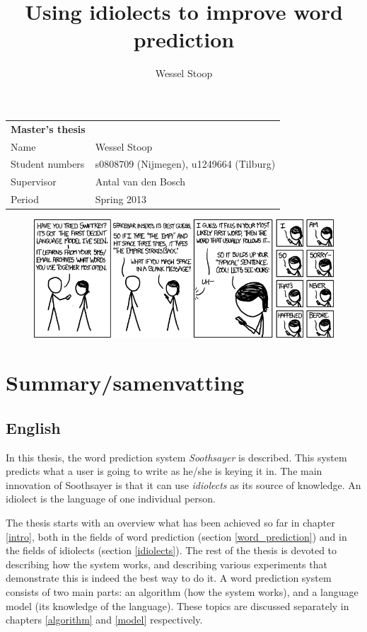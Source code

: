 \documentclass[12pt]{article}
\title{Using idiolects to improve word prediction}
\author{Wessel Stoop}
\let\stdsection\section
\renewcommand\section{\newpage\stdsection}
\let\originaltable\table
\let\endoriginaltable\endtable
\renewenvironment{table}[1][ht]{%
  \originaltable[#1]
  \centering}%
  {\endoriginaltable}
\begin{document}
\begin{table}[b]
\begin{tabular}{ll}
\textbf{Master's thesis}&\\
Name&Wessel Stoop\\
Student numbers&s0808709 (Nijmegen), u1249664 (Tilburg)\\
Supervisor&Antal van den Bosch\\
Period&Spring 2013\\
\end{tabular}
\end{table}

\maketitle
\thispagestyle{empty}

\begin{figure}
\includegraphics[scale=0.5]{swiftkey}
\end{figure}

\clearpage

\tableofcontents
\listoftables
\listoffigures

\section{Summary/samenvatting}

\subsection{English}
In this thesis, the word prediction system \emph{Soothsayer} is described. This system predicts what a user is going to write as he/she is keying it in. The main innovation of Soothsayer is that it can use \emph{idiolects} as its source of knowledge. An idiolect is the language of one individual person. 

The thesis starts with an overview what has been achieved so far in chapter \ref{intro}, both in the fields of word prediction (section \ref{word_prediction}) and in the fields of idiolects (section \ref{idiolects}). The rest of the thesis is devoted to describing how the system works, and describing various experiments that demonstrate this is indeed the best way to do it. A word prediction system consists of two main parts: an algorithm (how the system works), and a language model (its knowledge of the language). These topics are discussed separately in chapters \ref{algorithm} and \ref{model} respectively.
\end{document}
